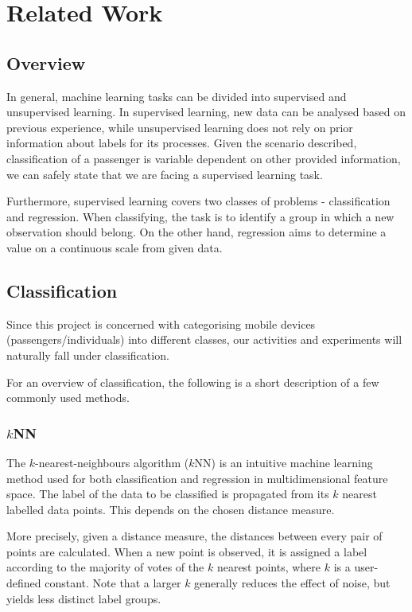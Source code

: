 \chapter{Related Work}
\label{chap:RelWork}
\section{Overview}
\par
In general, machine learning tasks can be divided into supervised and unsupervised learning. In supervised learning, new data can be analysed based on previous experience, while unsupervised learning does not rely on prior information about labels for its processes. Given the scenario described, classification of a passenger is variable dependent on other provided information, we can safely state that we are facing a supervised learning task.\\

\par
Furthermore, supervised learning covers two classes of problems - classification and regression. When classifying, the task is to identify a group in which a new observation should belong. On the other hand, regression aims to determine a value on a continuous scale from given data. 

\section{Classification}
Since this project is concerned with categorising mobile devices (passengers/individuals) into different classes, our activities and experiments will naturally fall under classification. 

\par
For an overview of classification, the following is a short description of a few commonly used methods.

\subsection{\texorpdfstring{$k$NN}{kNN}}
The $k$-nearest-neighbours algorithm ($k$NN) is an intuitive machine learning method used for both classification and regression in multidimensional feature space. The label of the data to be classified is propagated from its $k$ nearest labelled data points. This depends on the chosen distance measure.\\

\par
More precisely, given a distance measure, the distances between every pair of points are calculated. When a new point is observed, it is assigned a label according to the majority of votes of the $k$ nearest points, where $k$ is a user-defined constant. Note that a larger $k$ generally reduces the effect of noise, but yields less distinct label groups.\\

